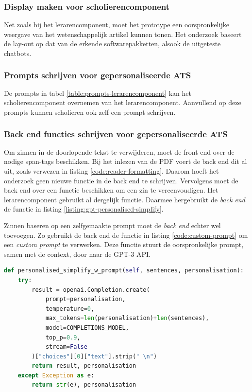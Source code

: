 \subsubsection{Display maken voor scholierencomponent}

Net zoals bij het lerarencomponent, moet het prototype een oorspronkelijke weergave van het wetenschappelijk artikel kunnen tonen. Het onderzoek baseert de lay-out op dat van de erkende softwarepakketten, alsook de uitgeteste chatbots. 

\subsubsection{Prompts schrijven voor gepersonaliseerde ATS}

De prompts in tabel \ref{table:prompts-lerarencomponent} kan het scholierencomponent overnemen van het lerarencomponent. Aanvullend op deze prompts kunnen scholieren ook zelf een prompt schrijven.

\subsubsection{Back end functies schrijven voor gepersonaliseerde ATS}

Om zinnen in de doorlopende tekst te verwijderen, moet de front end over de nodige span-tags beschikken. Bij het inlezen van de PDF voert de back end dit al uit, zoals verwezen in listing \ref{code:reader-formatting}. Daarom hoeft het onderzoek geen nieuwe functie in de back end te schrijven. Vervolgens moet de back end over een functie beschikken om een zin te vereenvoudigen. Het lerarencomponent gebruikt al dergelijk functie. Daarmee hergebruikt de \textit{back end} de functie in listing \ref{listing:gpt-personalised-simplify}. 

\medspace

Zinnen baseren op een zelfgemaakte prompt moet de \textit{back end} echter wel toevoegen. Zo gebruikt de back end de functie in listing \ref{code:custom-prompt} om een \textit{custom prompt} te verwerken. Deze functie stuurt de oorspronkelijke prompt, samen met de context, door naar de GPT-3 API.

\begin{lstlisting}[language=python, caption={Een API-call sturen naar GPT-3 met een custom prompt.}, label={code:custom-prompt}]
def personalised_simplify_w_prompt(self, sentences, personalisation):
	try:
		result = openai.Completion.create(
			prompt=personalisation,
			temperature=0,
			max_tokens=len(personalisation)+len(sentences),
			model=COMPLETIONS_MODEL,
			top_p=0.9,
			stream=False
		)["choices"][0]["text"].strip(" \n")
		return result, personalisation
	except Exception as e:
		return str(e), personalisation
\end{lstlisting}

